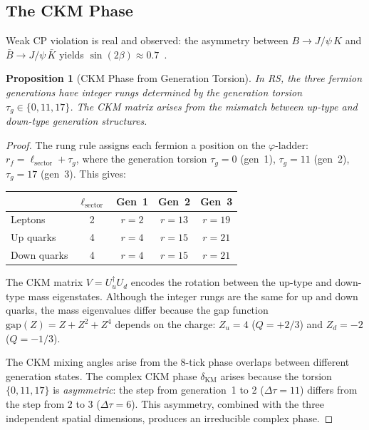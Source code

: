 \documentclass[12pt,a4paper]{article}
\newtheorem{proposition}[theorem]{Proposition}
\theoremstyle{definition}
\theoremstyle{remark}
\begin{document}
\subsection{The CKM Phase}

Weak CP violation is real and observed: the asymmetry between
$B \to J/\psi\, K$ and $\bar{B} \to J/\psi\, \bar{K}$ yields
$\sin(2\beta) \approx 0.7$~\cite{PDG}.

\begin{proposition}[CKM Phase from Generation Torsion]
\label{prop:ckm-phase}
In RS, the three fermion generations have integer rungs
determined by the generation torsion
$\tau_g \in \{0, 11, 17\}$.  The CKM matrix arises from the
mismatch between up-type and down-type generation structures.
\end{proposition}

\begin{proof}
The rung rule assigns each fermion a position on the
$\varphi$-ladder: $r_f = \ell_{\mathrm{sector}} + \tau_g$,
where the generation torsion $\tau_g = 0$ (gen~1), $\tau_g = 11$
(gen~2), $\tau_g = 17$ (gen~3).  This gives:
\begin{center}
\renewcommand{\arraystretch}{1.2}
\begin{tabular}{@{}lcccc@{}}
\toprule
& $\ell_{\mathrm{sector}}$ & Gen~1 & Gen~2 & Gen~3 \\
\midrule
Leptons & 2 & $r = 2$ & $r = 13$ & $r = 19$ \\
Up quarks & 4 & $r = 4$ & $r = 15$ & $r = 21$ \\
Down quarks & 4 & $r = 4$ & $r = 15$ & $r = 21$ \\
\bottomrule
\end{tabular}
\end{center}

The CKM matrix $V = U_u^\dagger U_d$ encodes the rotation
between the up-type and down-type mass eigenstates.  Although
the integer rungs are the same for up and down quarks, the
mass eigenvalues differ because the gap function
$\mathrm{gap}(Z) = Z + Z^2 + Z^4$ depends on the charge:
$Z_u = 4$ ($Q = +2/3$) and $Z_d = -2$ ($Q = -1/3$).

The CKM mixing angles arise from the 8-tick phase overlaps
between different generation states.  The complex CKM phase
$\delta_{\mathrm{KM}}$ arises because the torsion
$\{0, 11, 17\}$ is \emph{asymmetric}: the step from
generation~1 to 2 ($\Delta\tau = 11$) differs from the step
from 2 to 3 ($\Delta\tau = 6$).  This asymmetry, combined
with the three independent spatial dimensions, produces
an irreducible complex phase.
\end{proof}
\end{document}
